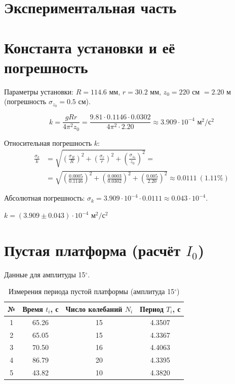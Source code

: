 \documentclass[12pt,a4paper]{article}
\begin{document}
\section*{Экспериментальная часть}

\section{Константа установки и её погрешность}

Параметры установки: \(R = 114.6\) мм, \(r = 30.2\) мм, \(z_0 = 220\) см \(= 2.20\) м (погрешность \(\sigma_{z_0} = 0.5\) см).

\begin{equation}
    k = \frac{g R r}{4\pi^2 z_0} = \frac{9.81 \cdot 0.1146 \cdot 0.0302}{4 \pi^2 \cdot 2.20} \approx 3.909 \cdot 10^{-4} \text{ м}^2/\text{с}^2
\end{equation}

Относительная погрешность \(k\):
\begin{equation}
\begin{split}
    \frac{\sigma_k}{k} &= \sqrt{\left(\frac{\sigma_{R}}{R}\right)^2 + \left(\frac{\sigma_{r}}{r}\right)^2 + \left(\frac{\sigma_{z_0}}{z_0}\right)^2} = \\
    &= \sqrt{\left(\frac{0.0005}{0.1146}\right)^2 + \left(\frac{0.0003}{0.0302}\right)^2 + \left(\frac{0.005}{2.20}\right)^2} \approx 0.0111 \ (1.11\%)
\end{split}
\end{equation}

Абсолютная погрешность: \(\sigma_k = 3.909 \cdot 10^{-4} \cdot 0.0111 \approx 0.043 \cdot 10^{-4}\).
\begin{center}
\(k = (3.909 \pm 0.043) \cdot 10^{-4} \text{ м}^2/\text{с}^2\)
\end{center}

\section{Пустая платформа (расчёт \(I_0\))}

Данные для амплитуды 15\(^\circ\).
\begin{table}[H]
    \centering
    \caption{Измерения периода пустой платформы (амплитуда 15\(^\circ\))}
    \begin{tabular}{cccc}
        \toprule
        № & Время \(t_i\), с & Число колебаний \(N_i\) & Период \(T_i\), с \\
        \midrule
        1 & 65.26 & 15 & 4.3507 \\
        2 & 65.05 & 15 & 4.3367 \\
        3 & 70.50 & 16 & 4.4063 \\
        4 & 86.79 & 20 & 4.3395 \\
        5 & 43.82 & 10 & 4.3820 \\
        \bottomrule
    \end{tabular}
\end{table}
\end{document}
